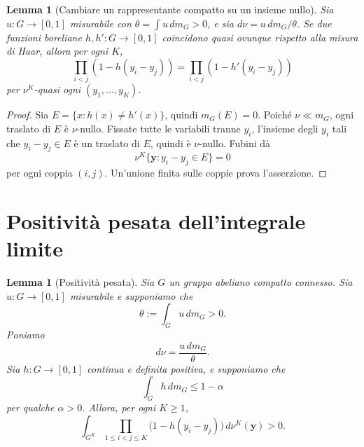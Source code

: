 \documentclass[11pt]{article}
\numberwithin{equation}{section}
\newtheorem{lemma}[theorem]{Lemma}
\newcommand{\1}{\mathbf 1}
\begin{document}
\begin{lemma}[Cambiare un rappresentante compatto su un insieme nullo]
\label{lem:null-representative}
Sia \(u:G\to[0,1]\) misurabile con \(\theta=\int u\,dm_G>0\), e sia \(d\nu=u\,dm_G/\theta\). Se due funzioni boreliane \(h,h':G\to[0,1]\) coincidono quasi ovunque rispetto alla misura di Haar, allora per ogni \(K\),
\[
        \prod_{i<j}(1-h(y_i-y_j))
        =
        \prod_{i<j}(1-h'(y_i-y_j))
\]
per \(\nu^K\)-quasi ogni \((y_1,\ldots,y_K)\).
\end{lemma}

\begin{proof}
Sia \(E=\{x:h(x)\ne h'(x)\}\), quindi \(m_G(E)=0\). Poiché \(\nu\ll m_G\), ogni traslato di \(E\) è \(\nu\)-nullo. Fissate tutte le variabili tranne \(y_i\), l'insieme degli \(y_i\) tali che \(y_i-y_j\in E\) è un traslato di \(E\), quindi è \(\nu\)-nullo. Fubini dà
\[
        \nu^K\{\mathbf y:y_i-y_j\in E\}=0
\]
per ogni coppia \((i,j)\). Un'unione finita sulle coppie prova l'asserzione.
\end{proof}

\section{Positività pesata dell'integrale limite}
\label{sec:weighted-positivity}

\begin{lemma}[Positività pesata]
\label{lem:weighted-positivity}
Sia \(G\) un gruppo abeliano compatto connesso. Sia \(u:G\to[0,1]\) misurabile e supponiamo che
\[
        \theta:=\int_G u\,dm_G>0.
\]
Poniamo
\[
        d\nu=\frac{u\,dm_G}{\theta}.
\]
Sia \(h:G\to[0,1]\) continua e definita positiva, e supponiamo che
\[
        \int_G h\,dm_G\le1-\alpha
\]
per qualche \(\alpha>0\). Allora, per ogni \(K\ge1\),
\[
        \int_{G^K}
        \prod_{1\le i<j\le K}
        \bigl(1-h(y_i-y_j)\bigr)\,d\nu^K(\mathbf y)>0.
\]
\end{lemma}
\end{document}
